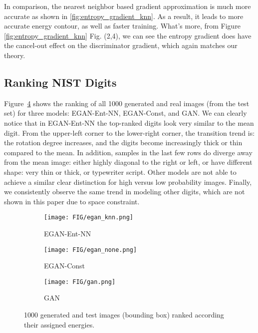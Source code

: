 \documentclass[a4paper]{article}
\begin{document}
In comparison, the nearest neighbor based gradient approximation is much more accurate as shown in \ref{fig:entropy_gradient_knn}.
As a result, it leads to more accurate energy contour, as well as faster training.
What's more, from Figure \ref{fig:entropy_gradient_knn} Fig. (2,4), we can see the entropy gradient does have the cancel-out effect on the discriminator gradient, which again matches our theory.

\subsection{Ranking NIST Digits}
\label{sec:a-nist_experiment}
Figure~\ref{fig:nist_result_all} shows the ranking of all 1000 generated and real images (from the test set) for three models: EGAN-Ent-NN, EGAN-Const, and GAN. We can clearly notice that in EGAN-Ent-NN the top-ranked digits look very similar to the mean digit. From the upper-left corner to the lower-right corner, the transition trend is: the rotation degree increases, and the digits become increasingly thick or thin compared to the mean. 
In addition, samples in the last few rows do diverge away from the mean image: either highly diagonal to the right or left, or have different shape: very thin or thick, or typewriter script. Other models are not able to achieve a similar clear distinction for high versus low probability images.
Finally, we consistently observe the same trend in modeling other digits, which are not shown in this paper due to space constraint.

\begin{figure}[]
  \begin{subfigure}[b]{\linewidth}
    \texttt{[image: FIG/egan\_knn.png]}
    \caption{EGAN-Ent-NN}
    \label{fig:nist_egan_knn_all}
  \end{subfigure}
  \hfill
  \begin{subfigure}[b]{\linewidth}
    \texttt{[image: FIG/egan\_none.png]}
    \caption{EGAN-Const}
    \label{fig:nist_egan_none_all}
  \end{subfigure}
  \hfill
  \begin{subfigure}[b]{\linewidth}
    \texttt{[image: FIG/gan.png]}
    \caption{GAN}
    \label{fig:nist_gan_all}
  \end{subfigure}
  \caption{1000 generated and test images (bounding box) ranked according their assigned energies.}
 \label{fig:nist_result_all}
\end{figure}
\end{document}
